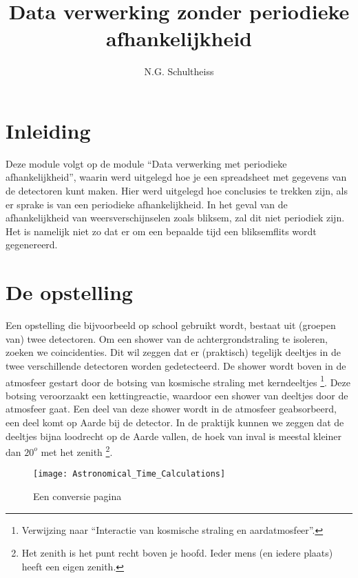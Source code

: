 



\title{Data verwerking zonder periodieke afhankelijkheid}
\author{N.G. Schultheiss}
\date{}

\maketitle
\thispagestyle{firststyle}

\section{Inleiding}

Deze module volgt op de module ``Data verwerking met periodieke
afhankelijkheid'', waarin werd uitgelegd hoe je een spreadsheet met
gegevens van de detectoren kunt maken. Hier werd uitgelegd hoe
conclusies te trekken zijn, als er sprake is van een periodieke
afhankelijkheid. In het geval van de afhankelijkheid van
weersverschijnselen zoals bliksem, zal dit niet periodiek zijn. Het is
namelijk niet zo dat er om een bepaalde tijd een bliksemflits wordt
gegenereerd. 


\section{De opstelling}

Een opstelling die bijvoorbeeld op school gebruikt wordt, bestaat uit
(groepen van) twee detectoren. Om een shower van de achtergrondstraling
te isoleren, zoeken we coincidenties. Dit wil zeggen dat er (praktisch)
tegelijk deeltjes in de twee verschillende detectoren worden
gedetecteerd. De shower wordt boven in de atmosfeer gestart door de
botsing van kosmische straling met kerndeeltjes \footnote{Verwijzing
naar {}``Interactie van kosmische straling en aardatmosfeer''.}. Deze
botsing veroorzaakt een kettingreactie, waardoor een shower van deeltjes
door de atmosfeer gaat. Een deel van deze shower wordt in de atmosfeer
geabsorbeerd, een deel komt op Aarde bij de detector. In de praktijk
kunnen we zeggen dat de deeltjes bijna loodrecht op de Aarde vallen, de
hoek van inval is meestal kleiner dan $20^{o}$ met het zenith
\footnote{Het zenith is het punt recht boven je hoofd. Ieder mens (en
iedere plaats) heeft een eigen zenith.}.

\begin{figure}[h]
\centering

\texttt{[image: Astronomical\_Time\_Calculations]}

\caption{Een conversie pagina}
\end{figure}


